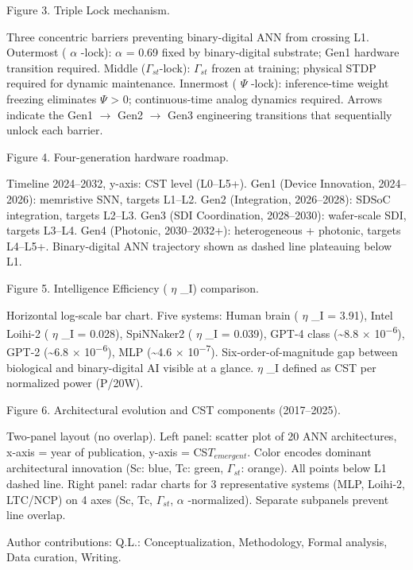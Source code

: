 \documentclass[a4paper,12pt]{article}
\begin{document}
Figure 3. Triple Lock mechanism.

Three concentric barriers preventing binary-digital ANN from crossing L1.
Outermost ( $\alpha$ -lock):  $\alpha$  = 0.69 fixed by binary-digital substrate; Gen1 hardware transition required.
Middle ($\Gamma_{st}$-lock): $\Gamma_{st}$ frozen at training; physical STDP required for dynamic maintenance.
Innermost ( $\Psi$ -lock): inference-time weight freezing eliminates  $\Psi$  > 0; continuous-time analog dynamics required.
Arrows indicate the Gen1 $\rightarrow$ Gen2 $\rightarrow$ Gen3 engineering transitions that sequentially unlock each barrier.

Figure 4. Four-generation hardware roadmap.

Timeline 2024--2032, y-axis: CST level (L0--L5+). Gen1 (Device Innovation, 2024--2026): memristive SNN, targets L1--L2. Gen2 (Integration, 2026--2028): SDSoC integration, targets L2--L3. Gen3 (SDI Coordination, 2028--2030): wafer-scale SDI, targets L3--L4. Gen4 (Photonic, 2030--2032+): heterogeneous + photonic, targets L4--L5+. Binary-digital ANN trajectory shown as dashed line plateauing below L1.

Figure 5. Intelligence Efficiency ( $\eta$ \_I) comparison.

Horizontal log-scale bar chart. Five systems: Human brain ( $\eta$ \_I = 3.91), Intel Loihi-2 ( $\eta$ \_I = 0.028), SpiNNaker2 ( $\eta$ \_I = 0.039), GPT-4 class (\textasciitilde{}8.8 $\times$ 10\textsuperscript{$-$}\textsuperscript{6}), GPT-2 (\textasciitilde{}6.8 $\times$ 10\textsuperscript{$-$}\textsuperscript{6}), MLP (\textasciitilde{}4.6 $\times$ 10\textsuperscript{$-$}\textsuperscript{7}). Six-order-of-magnitude gap between biological and binary-digital AI visible at a glance.  $\eta$ \_I defined as CST per normalized power (P/20W).

Figure 6. Architectural evolution and CST components (2017--2025).

Two-panel layout (no overlap). Left panel: scatter plot of 20 ANN architectures, x-axis = year of publication, y-axis = CS$T_{emergent}$. Color encodes dominant architectural innovation (Sc: blue, Tc: green, $\Gamma_{st}$: orange). All points below L1 dashed line. Right panel: radar charts for 3 representative systems (MLP, Loihi-2, LTC/NCP) on 4 axes (Sc, Tc, $\Gamma_{st}$,  $\alpha$ -normalized). Separate subpanels prevent line overlap.

Author contributions: Q.L.: Conceptualization, Methodology, Formal analysis, Data curation, Writing.
\end{document}
